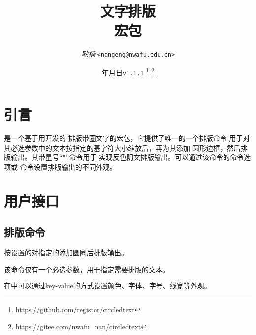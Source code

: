 \documentclass[full]{l3doc}
\def\vers{\texttt{v1.1.1} }
\begin{document}
\title{
  文字排版\\ 宏包
}
\author{\textit{耿楠} \texttt{<nangeng@nwafu.edu.cn>}}
\date{\the\year 年\the\month 月\the\day 日\qquad \vers
\thanks{\url{https://github.com/registor/circledtext}}
\thanks{\url{https://gitee.com/nwafu_nan/circledtext}}
}
\maketitle

{\small
\tableofcontents
}
\newpage

\begin{documentation}

\section{引言}

是一个基于用开发的
排版带圈文字的宏包，它提供了唯一的一个排版命令%
用于对其必选参数中的文本按指定的基字符大小缩放后，再为其添加
圆形边框，然后排版输出。其带星号``*''命令用于
实现反色阴文排版输出。可以通过该命令的命令选项或%
命令设置排版输出的不同外观。

\section{用户接口}

\subsection{排版命令}

\begin{function}{\circledtext}
  \begin{syntax}
      
  \end{syntax}
\end{function}

  按设置的对指定的添加圆圈后排版输出。

  该命令仅有一个必选参数，用于指定需要排版的文本。

  在中可以通过key-value的方式设置颜色、字体、字号、线宽等外观。


\end{documentation}
\end{document}
